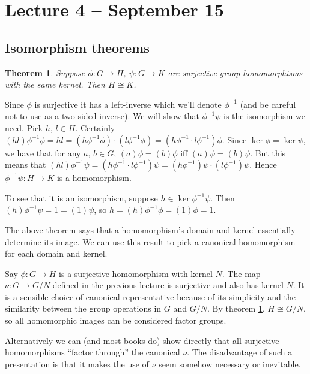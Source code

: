 \documentclass[letterpaper]{article}
\newtheorem{theorem}{Theorem}[section]
\newcommand{\mdot}{{\cdot}}
\newenvironment{proof}[1][Proof]{\begin{trivlist}
\item[\hskip \labelsep {\bfseries #1}]}{\end{trivlist}}
\begin{document}
\section{Lecture 4 -- September 15}

\subsection{Isomorphism theorems}

\begin{theorem}
\label{firstiso}
Suppose $\phi \colon G \rightarrow H$, $\psi \colon G \rightarrow
K$ are surjective group homomorphisms with the same kernel. Then
$H \cong K$.
\end{theorem}
\begin{proof}
Since $\phi$ is surjective it has a left-inverse which we'll denote
$\phi^{-1}$ (and be careful not to use as a two-sided inverse). We
will show that $\phi^{-1}\psi$ is the isomorphism we need. Pick
$h$, $l \in H$. Certainly $(hl)\phi^{-1}\phi = hl = (h\phi^{-1}
\phi)\mdot(l\phi^{-1}\phi) = (h\phi^{-1}\mdot l\phi^{-1})\phi$.
Since $\ker{\phi} = \ker{\psi}$, we have that for any $a$, $b \in
G$, $(a)\phi = (b)\phi$ iff $(a)\psi = (b)\psi$. But this means
that $(hl)\phi^{-1}\psi = (h\phi^{-1}\mdot l\phi^{-1})\psi =
(h\phi^{-1})\psi\mdot (l\phi^{-1})\psi$. Hence $\phi^{-1}\psi \colon
H \rightarrow K$ is a homomorphism.

To see that it is an isomorphism, suppose $h \in \ker{ \phi^{-1}\psi}$.
Then $(h)\phi^{-1}\psi = 1 = (1)\psi$, so $h = (h)\phi^{-1}\phi =
(1)\phi = 1$.
\end{proof}

The above theorem says that a homomorphism's domain and kernel
essentially determine its image. We can use this result to pick a
canonical homomorphism for each domain and kernel.

Say $\phi \colon G \rightarrow H$ is a surjective homomorphism with
kernel $N$. The map $\nu \colon G \rightarrow G/N$ defined in the
previous lecture is surjective and also has kernel $N$. It is a
sensible choice of canonical representative because of its simplicity
and the similarity between the group operations in $G$ and $G/N$.
By theorem \ref{firstiso}, $H \cong G/N$, so all homomorphic images
can be considered factor groups.

Alternatively we can (and most books do) show directly that all
surjective homomorphisms ``factor through'' the canonical $\nu$.
The disadvantage of such a presentation is that it makes the use
of $\nu$ seem somehow necessary or inevitable.
\end{document}
